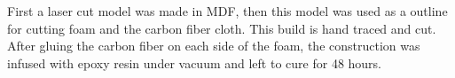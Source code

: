 \begin{figure}[H]
\end{figure} 
\noindent
First a laser cut model was made in MDF, then this model was used as a outline for cutting foam and the carbon fiber cloth. This build is hand traced and cut. After gluing the carbon fiber on each side of the foam, the construction was infused with epoxy resin under vacuum and left to cure for 48 hours.


\newpage



